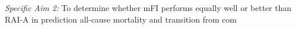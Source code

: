 \emph{Specific Aim 2:} To determine whether mFI performs equally well or better than RAI-A in prediction all-cause mortality and transition from com